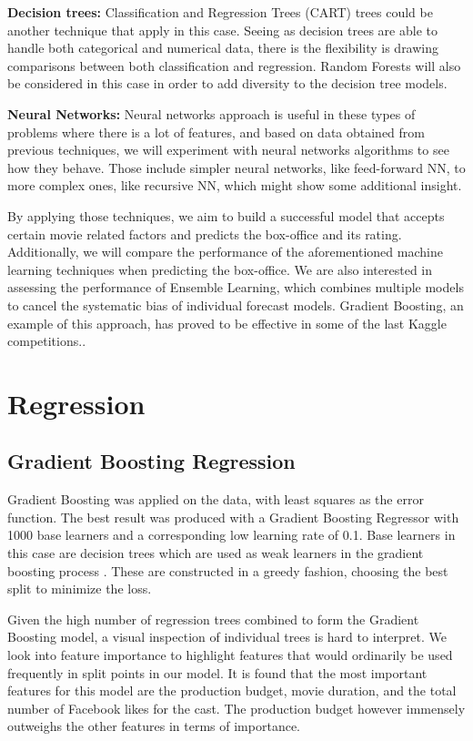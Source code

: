 \textbf{Decision trees:}
Classification and Regression Trees (CART) trees could be another technique that apply in this case. Seeing as decision trees are able to handle both categorical and numerical data, there is the flexibility is drawing comparisons between both classification and regression.  Random Forests will also be considered in this case in order to add diversity to the decision tree models. 

\textbf{Neural Networks:}
Neural networks approach is useful in these types of problems where there is a lot of features, and based on data obtained from previous techniques, we will experiment with neural networks algorithms to see how they behave. Those include simpler neural networks, like feed-forward NN, to more complex ones, like recursive NN, which might show some additional insight.

By applying those techniques, we aim to build a successful model that accepts certain movie related factors and predicts the box-office and its rating. Additionally, we will compare the performance of the aforementioned machine learning techniques when predicting the box-office. We are also interested in assessing the performance of Ensemble Learning, which combines multiple models to cancel the systematic bias of individual forecast models. Gradient Boosting, an example of this approach, has proved to be effective in some of the last Kaggle competitions..
\section{Regression}
\subsection{Gradient Boosting Regression}
Gradient Boosting was applied on the data, with least squares as the error function. The best result was produced with a Gradient Boosting Regressor with 1000 base learners and a corresponding low learning rate of 0.1. Base learners in this case are decision trees which are used as weak learners in the gradient boosting process \cite{natekin2013gradient}. These are constructed in a greedy fashion, choosing the best split to minimize the loss. 

Given the high number of regression trees combined to form the Gradient Boosting model, a visual inspection of individual trees is hard to interpret. We look into feature importance to highlight features that would ordinarily be used frequently in split points in our model. It is found that the most important features for this model are the production budget,  movie duration, and the total number of Facebook likes for the cast. The production budget however immensely outweighs the other features in terms of importance. 


